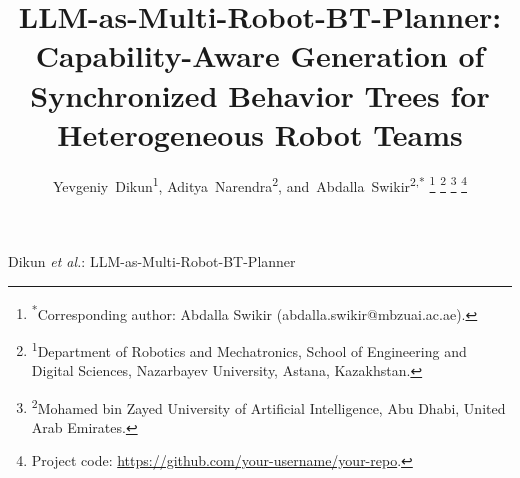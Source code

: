 \documentclass[journal]{IEEEtran}
\begin{document}
\title{LLM-as-Multi-Robot-BT-Planner: Capability-Aware Generation of Synchronized Behavior Trees for Heterogeneous Robot Teams}

\author{
Yevgeniy~Dikun\textsuperscript{1},
Aditya~Narendra\textsuperscript{2},
and~Abdalla~Swikir\textsuperscript{2,*}%
\thanks{\textsuperscript{*}Corresponding author: Abdalla Swikir (abdalla.swikir@mbzuai.ac.ae).}%
\thanks{\textsuperscript{1}Department of Robotics and Mechatronics, School of Engineering and Digital Sciences, Nazarbayev University, Astana, Kazakhstan.}%
\thanks{\textsuperscript{2}Mohamed bin Zayed University of Artificial Intelligence, Abu Dhabi, United Arab Emirates.}%
\thanks{Project code: \url{https://github.com/your-username/your-repo}.}%
}

%
{Dikun \MakeLowercase{\textit{et al.}}: LLM-as-Multi-Robot-BT-Planner}
\end{document}
